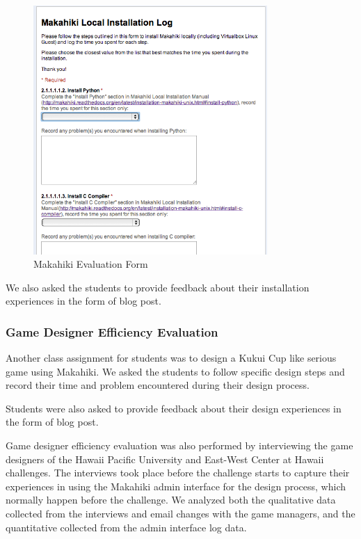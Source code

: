\documentclass{sigchi}
\begin{document}
\begin{figure}[ht!]
   \centering
   \includegraphics[width=3.5in]{developer-eval-form}
   \caption{Makahiki Evaluation Form}
   \label{fig:makahiki-eval-form}
\end{figure}

We also asked the students to provide feedback about their
installation experiences in the form of blog post.

\subsubsection{Game Designer Efficiency Evaluation}

Another class assignment for students was to design a Kukui Cup like
serious game using Makahiki. We asked the students to follow specific
design steps and record their time and problem encountered during
their design process.

Students were also asked to provide feedback about their design
experiences in the form of blog post.

Game designer efficiency evaluation was also performed by interviewing
the game designers of the Hawaii Pacific University and East-West
Center at Hawaii challenges. The interviews took place before the
challenge starts to capture their experiences in using the Makahiki
admin interface for the design process, which normally happen before
the challenge. We analyzed both the qualitative data collected from
the interviews and email changes with the game managers, and the
quantitative collected from the admin interface log data.
\end{document}
